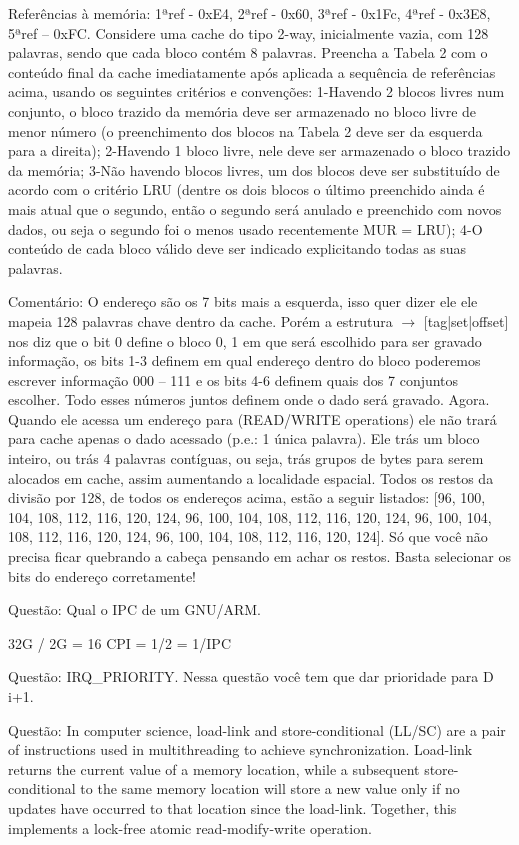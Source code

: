 \documentclass{article}
\begin{document}
Referências à memória: 1ªref - 0xE4, 2ªref - 0x60, 3ªref - 0x1Fc, 4ªref -
0x3E8, 5ªref – 0xFC. Considere uma cache do tipo 2-way, inicialmente vazia, com
128 palavras, sendo que cada bloco contém 8 palavras. Preencha a Tabela 2 com o
conteúdo final da cache imediatamente após aplicada a sequência de referências
acima, usando os seguintes critérios e convenções: 1-Havendo 2 blocos livres
num conjunto, o bloco trazido da memória deve ser armazenado no bloco livre de
menor número (o preenchimento dos blocos na Tabela 2 deve ser da esquerda para
a direita); 2-Havendo 1 bloco livre, nele deve ser armazenado o bloco trazido
da memória; 3-Não havendo blocos livres, um dos blocos deve ser substituído de
acordo com o critério LRU (dentre os dois blocos o último preenchido ainda é
mais atual que o segundo, então o segundo será anulado e preenchido com novos
dados, ou seja o segundo foi o menos usado recentemente MUR = LRU); 4-O
conteúdo de cada bloco válido deve ser indicado explicitando todas as suas
palavras.


Comentário: O endereço são os 7 bits mais a esquerda, isso quer dizer ele ele
mapeia 128 palavras chave dentro da cache. Porém a estrutura $\rightarrow$
[tag|set|offset] nos diz que o bit 0 define o bloco {0, 1} em que será escolhido
para ser gravado informação, os bits 1-3 definem em qual endereço dentro do
bloco poderemos escrever informação {000 – 111} e os bits 4-6 definem quais dos
7 conjuntos escolher. Todo esses números juntos definem onde o dado será
gravado. Agora. Quando ele acessa um endereço para (READ/WRITE operations) ele
não trará para cache apenas o dado acessado (p.e.: 1 única palavra). Ele trás um
bloco inteiro, ou trás 4 palavras contíguas, ou seja, trás grupos de bytes para
serem alocados em cache, assim aumentando a localidade espacial. Todos os restos
da divisão por 128, de todos os endereços acima, estão a seguir listados: [96,
100, 104, 108, 112, 116, 120, 124, 96, 100, 104, 108, 112, 116, 120, 124, 96,
100, 104, 108, 112, 116, 120, 124, 96, 100, 104, 108, 112, 116, 120, 124]. Só
que você não precisa ficar quebrando a cabeça pensando em achar os restos. Basta
selecionar os bits do endereço corretamente!


Questão: Qual o IPC de um GNU/ARM.


32G / 2G = 16
CPI = 1/2 = 1/IPC


Questão: IRQ\_PRIORITY. Nessa questão você tem que dar prioridade para D i+1.


Questão: In computer science, load-link and store-conditional (LL/SC) are a
pair of instructions used in multithreading to achieve synchronization.
Load-link returns the current value of a memory location, while a subsequent
store-conditional to the same memory location will store a new value only if no
updates have occurred to that location since the load-link. Together, this
implements a lock-free atomic read-modify-write operation.
\end{document}
